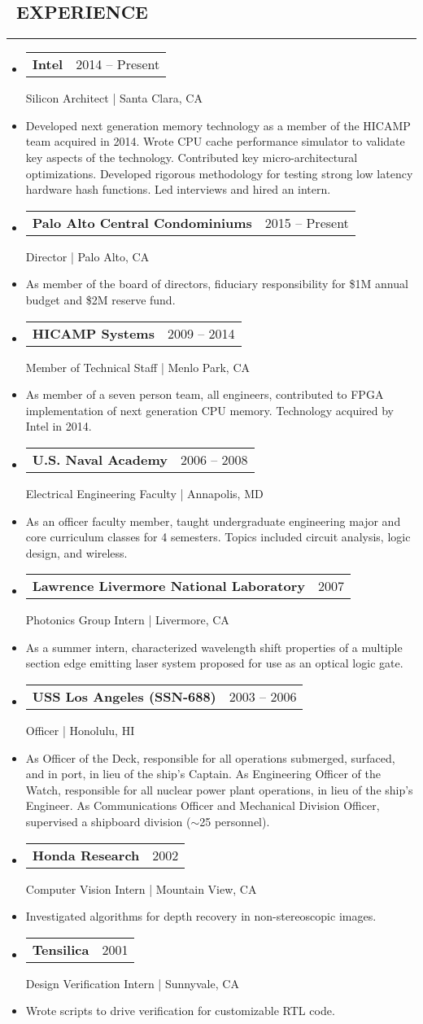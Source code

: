 \documentclass[10pt,letterpaper]{article}
\makeatletter
\newenvironment{resumesection}[1]
{%
    \subsection*{\ \textcolor{light-gray}{#1} }
    \vspace{-0.4em}
    \begin{samepage}
    \hrule
    \end{samepage}
    \vspace{+0.4em}
    \begin{itemize}[leftmargin=0.15cm]
        \parskip=0.1em
}%
{%
    \end{itemize}
}%
\newcommand{\myitem}[1] {
    \item[] \textcolor{dark-gray}{#1}
}
\newcommand{\headertri}[3] {
    \item[] \begin{tabular*}{\linewidth}{l@{\extracolsep{\fill}}r}
    \textbf{#1} & #2 \\
    \end{tabular*}
    #3
}
\newcommand{\cminiw}{0.075}
\newcommand{\rminiw}{0.550}
\makeatother
\begin{document}
\begin{minipage}[t]{\cminiw\textwidth}
\end{minipage}\hfill
\begin{minipage}[t]{\rminiw\textwidth}
\begin{resumesection}{EXPERIENCE}
    \headertri
    {Intel}
    {2014 -- Present}
    {Silicon Architect | Santa Clara, CA}
    \myitem{Developed next generation memory technology as a member of the HICAMP team acquired in 2014.
            Wrote CPU cache performance simulator to validate key aspects of the technology.
            Contributed key micro-architectural optimizations.
            Developed rigorous methodology for testing strong low latency hardware hash functions.
            Led interviews and hired an intern.}
    
    \headertri
    {Palo Alto Central Condominiums}
    {2015 -- Present}
    {Director | Palo Alto, CA}
    \myitem{As member of the board of directors, fiduciary responsibility for \$1M annual budget and \$2M reserve fund.}
    
    \headertri
    {HICAMP Systems}
    {2009 -- 2014}
    {Member of Technical Staff | Menlo Park, CA}
    \myitem{As member of a seven person team, all engineers, contributed to FPGA implementation
            of next generation CPU memory. Technology acquired by Intel in 2014.}
    
    \headertri
    {U.S. Naval Academy}
    {2006 -- 2008}
    {Electrical Engineering Faculty | Annapolis, MD}
    \myitem{As an officer faculty member, taught undergraduate engineering major and core curriculum classes for 4 semesters.
            Topics included circuit analysis, logic design, and wireless.}
    
    \headertri
    {Lawrence Livermore National Laboratory}
    {2007}
    {Photonics Group Intern | Livermore, CA}
    \myitem{As a summer intern, characterized wavelength shift properties of a multiple section edge emitting laser system proposed for use as an optical logic gate.}
    
    \headertri
    {USS Los Angeles (SSN-688)}
    {2003 -- 2006}
    {Officer | Honolulu, HI}
    \myitem{As Officer of the Deck, responsible for all operations submerged, surfaced, and in port, in lieu of the ship's Captain.
            As Engineering Officer of the Watch, responsible for all nuclear power plant operations, in lieu of the ship's Engineer.
            As Communications Officer and Mechanical Division Officer, supervised a shipboard division ({\footnotesize{$\sim$}}25 personnel).}
    
    \headertri
    {Honda Research}
    {2002}
    {Computer Vision Intern | Mountain View, CA}
    \myitem{Investigated algorithms for depth recovery in non-stereoscopic images.}
    
    \headertri
    {Tensilica}
    {2001}
    {Design Verification Intern | Sunnyvale, CA}
    \myitem{Wrote scripts to drive verification for customizable RTL code.}
\end{resumesection}

\end{minipage}
\end{document}
